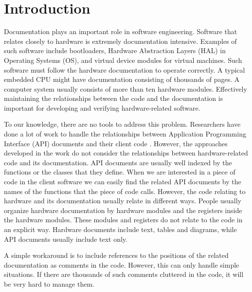 \documentclass[runningheads,a4paper]{llncs}
\begin{document}
\section{Introduction}
\label{sec:introduction}
Documentation plays an important role in software engineering.
Software that relates closely to hardware is extremely documentation intensive. %
Examples of such software include bootloaders, 
Hardware Abstraction Layers (HAL) in Operating Systems (OS),
and virtual device modules for virtual machines.
Such software must follow the hardware documentation to operate correctly.
A typical embedded CPU might have documentation consisting of thousands of pages.
A computer system usually consists of more than ten hardware modules.
Effectively maintaining the relationships between the code and the documentation is important for developing and verifying hardware-related software.

To our knowledge, there are no tools to address this problem.
Researchers have done a lot of work to handle the relationships between Application Programming Interface (API) documents and their client code \cite{Pandita_inferring_2012} \cite{wei_inferring_2011}.
However, the approaches developed in the work do not consider the relationships between hardware-related code and its documentation.
API documents are usually well indexed by the functions or the classes that they define.
When we are interested in a piece of code in the client software
we can easily find the related API documents by the names of the functions that the piece of code calls.
However, the code relating to hardware and its documentation usually relate in different ways.
People usually organize hardware documentation by hardware modules and the registers inside the hardware modules.
These modules and registers do not relate to the code in an explicit way.
Hardware documents include text, tables and diagrams, while API documents usually include text only.

A simple workaround is to include references to the positions of the related documentation as comments in the code.
However, this can only handle simple situations.
If there are thousands of such comments cluttered in the code,
it will be very hard to manage them.
\end{document}
